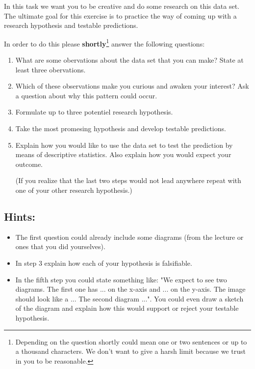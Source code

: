 \documentclass{WeSTassignment}
\begin{document}
In this task we want you to be creative and do some research on this data set. The ultimate goal for this exercise is to practice the way of coming up with a research hypothesis and testable predictions. 

In order to do this please \textbf{shortly}\footnote{Depending on the question shortly could mean one or two sentences or up to a thousand characters. We don't want to give a harsh limit because we trust in you to be reasonable.} answer the following questions: 

\begin{enumerate}
\item What are some obervations about the data set that you can make? State at least three obervations.
\item Which of these observations make you curious and awaken your interest? Ask a question about why this pattern could occur.
\item Formulate up to three potentiel research hypothesis.
\item Take the most promesing hypothesis and develop testable predictions.
\item Explain how you would like to use the data set to test the prediction by means of descriptive statistics. Also explain how you would expect your outcome. 

(If you realize that the last two steps would not lead anywhere repeat with one of your other research hypothesis.)
\end{enumerate}

\subsection{Hints:}
\begin{itemize}
\item The first question could already include some diagrams (from the lecture or ones that you did yourselves).
\item In step 3 explain how each of your hypothesis is falsifiable. 
\item In the fifth step you could state something like: "We expect to see two diagrams. The first one has ... on the x-axis and ... on the y-axis. The image should look like a ... The second diagram ...". You could even draw a sketch of the diagram and explain how this would support or reject your testable hypothesis. 
\end{itemize}

\end{document}
